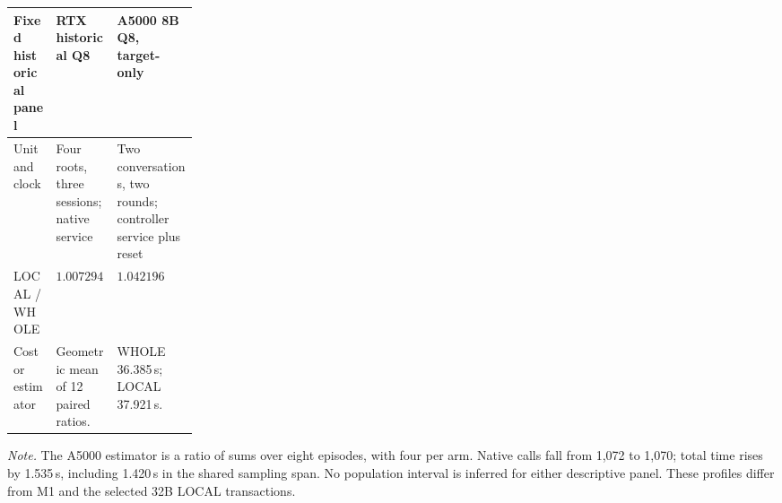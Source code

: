 \begingroup
\fontsize{8.7}{10.5}\selectfont
\setlength{\tabcolsep}{3.5pt}\renewcommand{\arraystretch}{1.03}
\noindent
\begin{tabularx}{\linewidth}{@{}>{\raggedright\arraybackslash}p{0.235\linewidth}>{\raggedright\arraybackslash}X>{\raggedright\arraybackslash}X@{}}
\toprule
Fixed historical panel & RTX historical Q8 & A5000 8B Q8, target-only\\
\midrule
Unit and clock & Four roots, three sessions; native service & Two conversations, two rounds; controller service plus reset\\
\midrule
LOCAL / WHOLE & $1.007294$ & $1.042196$\\
Cost or estimator & Geometric mean of 12 paired ratios. & WHOLE 36.385\,s; LOCAL 37.921\,s.\\
\bottomrule
\end{tabularx}
\par\smallskip
\fontsize{8}{9.6}\selectfont\raggedright
\textit{Note.} The A5000 estimator is a ratio of sums over eight episodes, with four per arm. Native calls fall from 1,072 to 1,070; total time rises by 1.535\,s, including 1.420\,s in the shared sampling span. No population interval is inferred for either descriptive panel. These profiles differ from M1 and the selected 32B LOCAL transactions.
\par\endgroup
